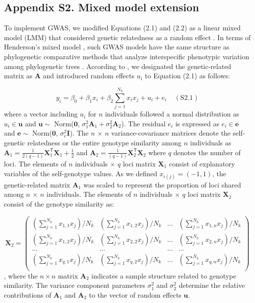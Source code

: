 \documentclass[12pt,]{article}
\begin{document}
\medskip
\subsection*{Appendix S2. Mixed model extension}
To implement GWAS, we modified Equations (2.1) and (2.2) as a linear mixed model (LMM) that considered genetic relatedness as a random effect \citep{kang2008efficient}. In terms of Henderson's mixed model \citep{henderson1959estimation}, such GWAS models have the same structure as phylogenetic comparative methods that analyze interspecific phenotypic variation among phylogenetic trees \citep{kang2008efficient, hadfield2010general}. According to \cite{hadfield2010general}, we designated the genetic-related matrix as $\mathbf{A}$ and introduced random effects $u_i$ to Equation (2.1) as follows: 

$$y_i = \beta_0 + \beta_1x_i + \beta_2\sum^{N_{k}}_{j=1}{x_ix_j} + u_i + e_i~~~~~(\mathrm{S2.1})$$
where a vector including $u_i$ for $n$ individuals followed a normal distribution as $u_i \in \mathbf{u}$ and $\mathbf{u} \sim$ Norm($\mathbf{0}$, $\sigma^2_1\mathbf{A}_1+\sigma^2_2\mathbf{A}_2$). The residual $e_i$ is expressed as $e_i \in \mathbf{e}$ and $\mathbf{e} \sim$ Norm($\mathbf{0}$, $\sigma^2_e\mathbf{I}$).
The $n$ × $n$ variance-covariance matrices denote the self-genetic relatedness or the entire genotype similarity among $n$ individuals as
$\mathbf{A}_1=\frac{1}{2(q-1)}\mathbf{X}_1^\mathsf{T}\mathbf{X}_1 + \frac{1}{2}$ and 
$\mathbf{A}_2=\frac{1}{(q-1)}\mathbf{X}_2^\mathsf{T} \mathbf{X}_2$
where $q$ denotes the number of loci. The elements of $n$ individuals $\times$ $q$ loci matrix $\mathbf{X}_1$ consist of explanatory variables of the self-genotype values. As we defined $x_{i(j)} = (-1, 1)$, the genetic-related matrix $\mathbf{A}_1$ was scaled to represent the proportion of loci shared among $n$ × $n$ individuals. The elements of $n$ individuals $\times$ $q$ loci matrix $\mathbf{X}_2$ consist of the genotype similarity as:

$$\mathbf{X}_2=\left(\begin{array}{cccc}
    (\sum^{N_k}_{j=1}x_{1,1} x_j)/N_k &  (\sum^{N_k}_{j=1}x_{1,2} x_j)/N_k &  ... &  (\sum^{N_k}_{j=1}x_{1,n} x_j)/N_k \\ 
    (\sum^{N_k}_{j=1}x_{1,2} x_j)/N_k &  (\sum^{N_k}_{j=1}x_{2,2} x_j)/N_k &  ... &  (\sum^{N_k}_{j=1}x_{2,n} x_j)/N_k\\
    ... & ... & ... & ... \\
    (\sum^{N_k}_{j=1}x_{q,1} x_j)/N_k &  (\sum^{N_k}_{j=1}x_{q,2} x_j)/N_k &  ... &  (\sum^{N_k}_{j=1}x_{q,n} x_j)/N_k \\
    \end{array} \right)
$$,
where the $n \times n$ matrix $\mathbf{A}_2$ indicates a sample structure related to genotype similarity. The variance component parameters $\sigma^2_1$ and $\sigma^2_2$ determine the relative contributions of $\mathbf{A}_1$ and $\mathbf{A}_2$ to the vector of random effects $\mathbf{u}$.
\end{document}
